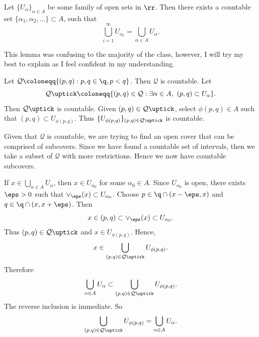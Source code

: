 \begin{lemma}{
    Let $\{U_\alpha\}_{\alpha\in A}$ be some family of open sets in $\rr$.
    Then there exists a countable set $\{\alpha_1,\alpha_2,\ldots\}\subset A$, such that
    \[
        \bigcup_{i=1}^\infty U_{\alpha_i} = \bigcup_{\alpha\in A} U_\alpha.
    \]
}
    \begin{remark}
        This lemma was confusing to the majority of the class, however, I will try my best to explain as I feel confident in my understanding.
    \end{remark}

    Let $\mathcal{Q} \coloneqq \{(p,q) : p,q\in\q, p < q\}$.
    Then $\mathcal{Q}$ is countable.
    Let
    \[
        \mathcal{Q}\uptick \coloneqq \{(p,q)\in\mathcal{Q} : \exists \alpha\in A,\ (p,q)\subset U_\alpha\}.
    \]
    Then $\mathcal{Q}\uptick$ is countable.
    Given $(p,q)\in\mathcal{Q}\uptick$, select $\phi(p,q)\in A$ such that $(p,q)\subset U_{\phi(p,q)}$.
    Thus $\{U_{\phi(p,q)}\}_{(p,q)\in\mathcal{Q}\uptick}$ is countable.

    \begin{remark}
        Given that $\mathcal{Q}$ is countable, we are trying to find an open cover that can be comprised of subcovers.
        Since we have found a countable set of intervals, then we take a subset of $\mathcal{Q}$ with more restrictions.
        Hence we now have countable subcovers.
    \end{remark}

    If $x\in\bigcup_{\alpha\in A} U_\alpha$, then $x\in U_{\alpha_0}$ for some $\alpha_0\in A$.
    Since $U_{\alpha_0}$ is open, there exists $\eps > 0$ such that $\vee_{\eps} (x)\subset U_{\alpha_0}$.
    Choose $p\in\q\cap (x-\eps, x)$ and $q\in\q\cap (x, x + \eps)$.
    Then
    \[
        x\in (p,q)\subset \vee_{\eps} (x)\subset U_{\alpha_0}.
    \]
    Thus $(p,q)\in\mathcal{Q}\uptick$ and $x\in U_{\phi(p,q)}$.
    Hence,
    \[
        x\in\bigcup_{(p,q)\in\mathcal{Q}\uptick} U_{\phi(p,q)}.
    \]
    Therefore
    \[
        \bigcup_{\alpha\in A} U_\alpha \subset \bigcup_{(p,q)\in\mathcal{Q}\uptick} U_{\phi(p,q)}.
    \]
    The reverse inclusion is immediate.
    So
    \[
        \bigcup_{(p,q)\in\mathcal{Q}\uptick} U_{\phi(p,q)} = \bigcup_{\alpha\in A} U_\alpha.
    \]
\end{lemma}